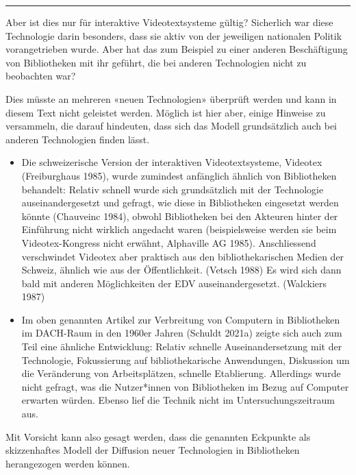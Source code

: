 \documentclass[a4paper,
fontsize=11pt,
oneside,
numbers=noperiodatend,
parskip=half-,
bibliography=totoc,
final
]{scrartcl}
\begin{document}
\begin{center}\rule{0.5\linewidth}{0.5pt}\end{center}

Aber ist dies nur für interaktive Videotextsysteme gültig? Sicherlich
war diese Technologie darin besonders, dass sie aktiv von der jeweiligen
nationalen Politik vorangetrieben wurde. Aber hat das zum Beispiel zu
einer anderen Beschäftigung von Bibliotheken mit ihr geführt, die bei
anderen Technologien nicht zu beobachten war?

Dies müsste an mehreren «neuen Technologien» überprüft werden und kann
in diesem Text nicht geleistet werden. Möglich ist hier aber, einige
Hinweise zu versammeln, die darauf hindeuten, dass sich das Modell
grundsätzlich auch bei anderen Technologien finden lässt.

\begin{itemize}
\item
  Die schweizerische Version der interaktiven Videotextsysteme, Videotex
  (Freiburghaus 1985), wurde zumindest anfänglich ähnlich von
  Bibliotheken behandelt: Relativ schnell wurde sich grundsätzlich mit
  der Technologie auseinandergesetzt und gefragt, wie diese in
  Bibliotheken eingesetzt werden könnte (Chauveinc 1984), obwohl
  Bibliotheken bei den Akteuren hinter der Einführung nicht wirklich
  angedacht waren (beispielsweise werden sie beim Videotex-Kongress
  nicht erwähnt, Alphaville AG 1985). Anschliessend verschwindet
  Videotex aber praktisch aus den bibliothekarischen Medien der Schweiz,
  ähnlich wie aus der Öffentlichkeit. (Vetsch 1988) Es wird sich dann
  bald mit anderen Möglichkeiten der EDV auseinandergesetzt. (Walckiers
  1987)
\item
  Im oben genannten Artikel zur Verbreitung von Computern in
  Bibliotheken im DACH-Raum in den 1960er Jahren (Schuldt 2021a) zeigte
  sich auch zum Teil eine ähnliche Entwicklung: Relativ schnelle
  Auseinandersetzung mit der Technologie, Fokussierung auf
  bibliothekarische Anwendungen, Diskussion um die Veränderung von
  Arbeitsplätzen, schnelle Etablierung. Allerdings wurde nicht gefragt,
  was die Nutzer*innen von Bibliotheken im Bezug auf Computer erwarten
  würden. Ebenso lief die Technik nicht im Untersuchungszeitraum aus.
\end{itemize}

Mit Vorsicht kann also gesagt werden, dass die genannten Eckpunkte als
skizzenhaftes Modell der Diffusion neuer Technologien in Bibliotheken
herangezogen werden können.
\end{document}
